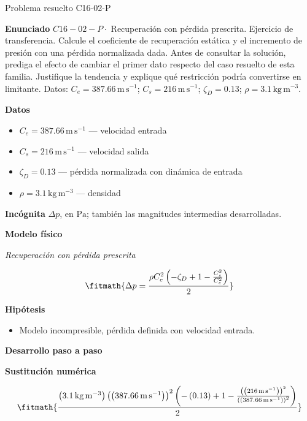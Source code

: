 \documentclass[10pt,openany]{book}
\begin{document}
\begin{studiumworked}{Problema resuelto C16-02-P}


\noindent\textbf{Enunciado}
\(C16-02-P \cdot\) Recuperación con pérdida prescrita. Ejercicio de transferencia. Calcule el coeficiente de recuperación estática y el incremento de presión con una pérdida normalizada dada. Antes de consultar la solución, prediga el efecto de cambiar el primer dato respecto del caso resuelto de esta familia. Justifique la tendencia y explique qué restricción podría convertirse en limitante. Datos: \(C_e=387.66\, \mathrm{m}\,\mathrm{s}^{-1}\); \(C_s=216\, \mathrm{m}\,\mathrm{s}^{-1}\); \(\zeta_D=0.13\); \(\rho=3.1\, \mathrm{kg}\,\mathrm{m}^{-3}\).

\noindent\textbf{Datos}
\begin{itemize}
\item $C_e = 387.66\,\mathrm{m}\,\mathrm{s}^{-1}$ — velocidad entrada
\item $C_s = 216\,\mathrm{m}\,\mathrm{s}^{-1}$ — velocidad salida
\item $\zeta_D = 0.13$ — pérdida normalizada con dinámica de entrada
\item $\rho = 3.1\,\mathrm{kg}\,\mathrm{m}^{-3}$ — densidad
\end{itemize}

\noindent\textbf{Incógnita}
$\Delta p$, en $\mathrm{Pa}$; también las magnitudes intermedias desarrolladas.

\noindent\textbf{Modelo físico}

\noindent\textit{Recuperación con pérdida prescrita}

\[
\fitmath{\Delta p=\frac{\rho C_e^{2} \left(- \zeta_D + 1 - \frac{C_s^{2}}{C_e^{2}}\right)}{2}}
\]

\noindent\textbf{Hipótesis}
\begin{itemize}
\item Modelo incompresible, pérdida definida con velocidad entrada.
\end{itemize}

\noindent\textbf{Desarrollo paso a paso}



\noindent\textbf{Sustitución numérica}

\[
\fitmath{\frac{\left(3.1\,\mathrm{kg}\,\mathrm{m}^{-3}\right) \left(\left(387.66\,\mathrm{m}\,\mathrm{s}^{-1}\right)\right)^{2} \left(- \left(0.13\right) + 1 - \frac{\left(\left(216\,\mathrm{m}\,\mathrm{s}^{-1}\right)\right)^{2}}{\left(\left(387.66\,\mathrm{m}\,\mathrm{s}^{-1}\right)\right)^{2}}\right)}{2}}
\]


\end{studiumworked}
\end{document}
